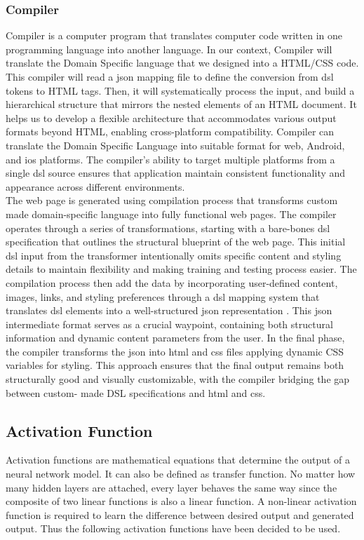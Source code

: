 \documentclass{ioereport}
\begin{document}
\subsubsection{Compiler}
Compiler is a computer program that translates computer code written in one
programming language into another language. In our context, Compiler will translate
the Domain Specific language that we designed into a HTML/CSS code. This compiler
will read a \gls{json} mapping file to define the conversion from \gls{dsl} tokens to HTML
tags. Then, it will systematically process the input, and build a hierarchical structure
that mirrors the nested elements of an HTML document.
It helps us to develop a flexible architecture that accommodates various output formats
beyond HTML, enabling cross-platform compatibility. Compiler can translate the
Domain Specific Language into suitable format for web, Android, and \gls{ios} platforms.
The compiler’s ability to target multiple platforms from a single \gls{dsl} source ensures
that application maintain consistent functionality and appearance across different
environments. \\
The web page is generated using compilation process that transforms custom made  
domain-specific language into fully functional web pages. The compiler operates
through a series of transformations, starting with a bare-bones \gls{dsl} specification 
that outlines the structural blueprint of the web page. This initial \gls{dsl} input from
the transformer intentionally omits specific content and styling details to maintain
flexibility and making training and testing process easier. The compilation process 
then add the data by incorporating user-defined content, images, links, and styling 
preferences through a \gls{dsl} mapping system that translates \gls{dsl} elements into a well-structured
\gls{json} representation . This \gls{json} intermediate format serves as a crucial waypoint, containing 
both structural 
information and dynamic content parameters from the user. In the final phase, the
 compiler transforms the \gls{json} into \gls{html} and \gls{css} files applying dynamic CSS variables
  for styling. This approach ensures that the final output remains both structurally 
  good and visually customizable, with the compiler bridging the gap between custom- 
  made DSL specifications and \gls{html} and \gls{css}.
\subsection{Activation Function}
Activation functions are mathematical equations that determine the output of a neural
network model. It can also be defined as transfer function. No matter how many hidden
layers are attached, every layer behaves the same way since the composite of two linear
functions is also a linear function. A non-linear activation function is required to learn
the difference between desired output and generated output. Thus the following
activation functions have been decided to be used.
\end{document}
